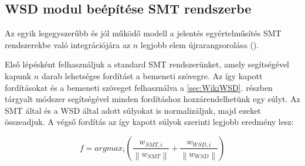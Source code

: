 \subsection{WSD modul beépítése SMT rendszerbe} \label{sec:WSDinSMT}

Az egyik legegyszerűbb és jól működő modell a jelentés egyértelműsítés SMT rendszerekbe való integrációjára az $n$ legjobb elem újrarangsorolása (\cite{apidianaki2012wsd}).

Első lépésként felhasználjuk a standard SMT rendszerünket, amely segítségével kapunk $n$ darab lehetséges fordítást a bemeneti szövegre. Az így kapott fordításokat és a bemeneti szöveget felhasználva a \ref{sec:WikiWSD}. részben tárgyalt módszer segítségével minden fordításhoz hozzárendelhetünk egy súlyt. Az SMT által és a WSD által adott súlyokat is normalizáljuk, majd ezeket összeadjuk. A végső fordítás az így kapott súlyok szerinti legjobb eredmény lesz:

\begin{equation}
	f = argmax_i (\frac{w_{SMT, i}}{\left\lVert w_{SMT} \right\rVert} + \frac{w_{WSD, i}}{\left\lVert w_{WSD} \right\rVert})
\end{equation}